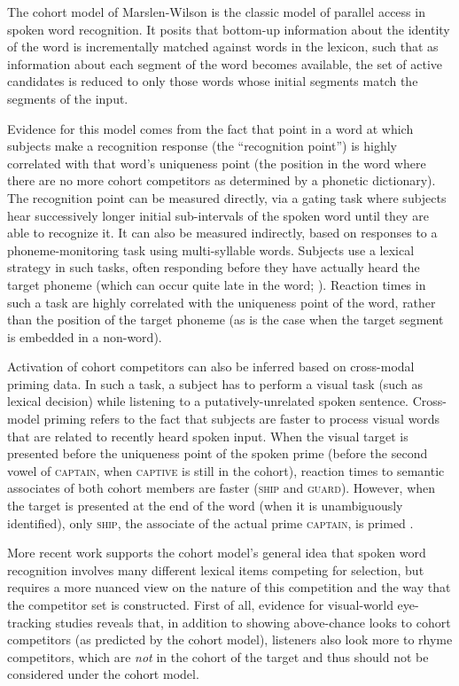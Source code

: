 \documentclass[11pt]{article}
\begin{document}
The cohort model of Marslen-Wilson is the classic model of parallel access in spoken word recognition.  It posits that bottom-up information about the identity of the word is incrementally matched against words in the lexicon, such that as information about each segment of the word becomes available, the set of active candidates is reduced to only those words whose initial segments match the segments of the input.  

Evidence for this model comes from the fact that point in a word at which subjects make a recognition response (the ``recognition point'') is highly correlated with that word's uniqueness point (the position in the word where there are no more cohort competitors as determined by a phonetic dictionary). The recognition point can be measured directly, via a gating task where subjects hear successively longer initial sub-intervals of the spoken word until they are able to recognize it.  It can also be measured indirectly, based on responses to a phoneme-monitoring task using multi-syllable words.  Subjects use a lexical strategy in such tasks, often responding before they have actually heard the target phoneme (which can occur quite late in the word; ).  Reaction times in such a task are highly correlated with the uniqueness point of the word, rather than the position of the target phoneme (as is the case when the target segment is embedded in a non-word).

Activation of cohort competitors can also be inferred based on cross-modal priming data.  In such a task, a subject has to perform a visual task (such as lexical decision) while listening to a putatively-unrelated spoken sentence.  Cross-model priming refers to the fact that subjects are faster to process visual words that are related to recently heard spoken input.  When the visual target is presented before the uniqueness point of the spoken prime (before the second vowel of \textsc{captain}, when \textsc{captive} is still in the cohort), reaction times to semantic associates of both cohort members are faster (\textsc{ship} and \textsc{guard}).  However, when the target is presented at the end of the word (when it is unambiguously identified), only \textsc{ship}, the associate of the actual prime \textsc{captain}, is primed \cite{Marslen-Wilson1987}.

More recent work supports the cohort model's general idea that spoken word recognition involves many different lexical items competing for selection, but requires a more nuanced view on the nature of this competition and the way that the competitor set is constructed.  First of all, evidence for visual-world eye-tracking studies reveals that, in addition to showing above-chance looks to cohort competitors (as predicted by the cohort model), listeners also look more to rhyme competitors, which are \emph{not} in the cohort of the target and thus should not be considered under the cohort model.
\end{document}
